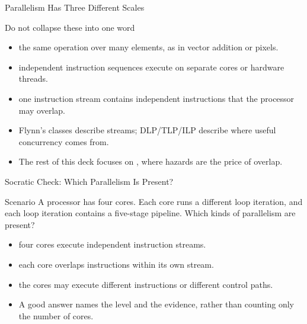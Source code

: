 \documentclass[aspectratio=169]{beamer}
\begin{document}
\begin{frame}{Parallelism Has Three Different Scales}
  \begin{block}{Do not collapse these into one word}
    \begin{itemize}
      \item {} the same operation over many
        elements, as in vector addition or pixels.
      \item {} independent instruction
        sequences execute on separate cores or hardware threads.
      \item {} one instruction stream
        contains independent instructions that the processor may overlap.
    \end{itemize}
  \end{block}
  \begin{itemize}
    \item Flynn's classes describe streams; DLP/TLP/ILP describe where useful
      concurrency comes from.
    \item The rest of this deck focuses on , where hazards are the price of overlap.
  \end{itemize}
\end{frame}

\begin{frame}{Socratic Check: Which Parallelism Is Present?}
  \begin{alertblock}{Scenario}
    A processor has four cores. Each core runs a different loop iteration, and
    each loop iteration contains a five-stage pipeline. Which kinds of
    parallelism are present?
  \end{alertblock}
  \begin{itemize}
    \item {} four cores execute independent instruction streams.
    \item {} each core overlaps instructions within its own stream.
    \item {} the cores may execute different
      instructions or different control paths.
    \item A good answer names the level and the evidence, rather than counting
      only the number of cores.
  \end{itemize}
\end{frame}

\end{document}
